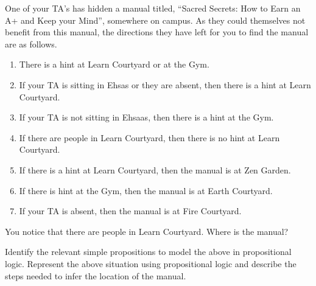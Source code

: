 \documentclass[addpoints]{exam}
\begin{document}
\begin{questions}

\question[5] One of your TA's has hidden a manual titled, ``Sacred Secrets: How to Earn an A+ and Keep your Mind'', somewhere on campus. As they could themselves not benefit from this manual, the directions they have left for you to find the manual are as follows.
  \begin{enumerate}
  \item There is a hint at Learn Courtyard or at the Gym.
  \item If your TA is sitting in Ehsas or they are absent, then there is a hint at Learn Courtyard.
  \item If your TA is not sitting in Ehsaas, then there is a hint at the Gym.
  \item If there are people in Learn Courtyard, then there is no hint at Learn Courtyard.
  \item If there is a hint at Learn Courtyard, then the manual is at Zen Garden.
  \item If there is hint at the Gym, then the manual is at Earth Courtyard.
  \item If your TA is absent, then the manual is at Fire Courtyard.
  \end{enumerate}
  You notice that there are people in Learn Courtyard. Where is the manual?

  Identify the relevant simple propositions to model the above in propositional logic. Represent the above situation using propositional logic and describe the steps needed to infer the location of the manual.
  \begin{solution}
  \end{solution}
  
\end{questions}
\end{document}
